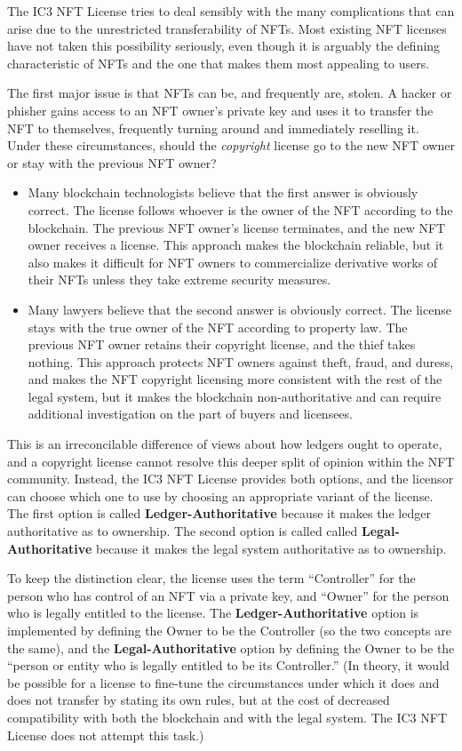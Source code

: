 \documentclass{article}
\newcommand{\iccclicense}{IC3 NFT License\xspace}
\newcommand{\keyword}[1]{\textbf{#1}\xspace}
\newcommand{\ledger}{\keyword{Ledger-Authoritative}}
\newcommand{\legal}{\keyword{Legal-Authoritative}}
\begin{document}
The \iccclicense tries to deal sensibly with the many complications that can arise due to the unrestricted transferability of NFTs. Most existing NFT licenses have not taken this possibility seriously, even though it is arguably the defining characteristic of NFTs and the one that makes them most appealing to users.

The first major issue is that NFTs can be, and frequently are, stolen. A hacker or phisher gains access to an NFT owner's private key and uses it to transfer the NFT to themselves, frequently turning around and immediately reselling it. Under these circumstances, should the \emph{copyright} license go to the new NFT owner or stay with the previous NFT owner?
\begin{itemize}
\item Many blockchain technologists believe that the first answer is obviously correct. The license follows whoever is the owner of the NFT according to the blockchain. The previous NFT owner's license terminates, and the new NFT owner receives a license. This approach makes the blockchain reliable, but it also makes it difficult for NFT owners to commercialize derivative works of their NFTs unless they take extreme security measures.
\item Many lawyers believe that the second answer is obviously correct. The license stays with the true owner of the NFT according to property law. The previous NFT owner retains their copyright license, and the thief takes nothing. This approach protects NFT owners against theft, fraud, and duress, and makes the NFT copyright licensing more consistent with the rest of the legal system, but it makes the blockchain non-authoritative and can require additional investigation on the part of buyers and licensees.
\end{itemize}

This is an irreconcilable difference of views about how ledgers ought to operate, and a copyright license cannot resolve this deeper split of opinion within the NFT community. Instead, the \iccclicense provides both options, and the licensor can choose which one to use by choosing an appropriate variant of the license. The first option is called \ledger because it makes the ledger authoritative as to ownership. The second option is called called \legal because it makes the legal system authoritative as to ownership.
 
To keep the distinction clear, the license uses the term ``Controller'' for the person who has control of an NFT via a private key, and ``Owner'' for the person who is legally entitled to the license. The \ledger option is implemented by defining the Owner to be the Controller (so the two concepts are the same), and the \legal option by defining the Owner to be the ``person or entity who is legally entitled to be its Controller.'' (In theory, it would be possible for a license to fine-tune the circumstances under which it does and does not transfer by stating its own rules, but at the cost of decreased compatibility with both the blockchain and with the legal system. The \iccclicense does not attempt this task.)
\end{document}
